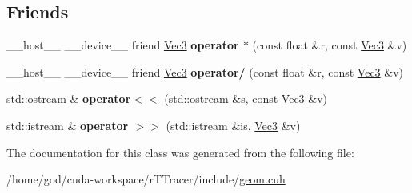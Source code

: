 \subsection*{Friends}
\begin{DoxyCompactItemize}
\item 
\+\_\+\+\_\+host\+\_\+\+\_\+ \+\_\+\+\_\+device\+\_\+\+\_\+ friend \hyperlink{class_vec3}{Vec3} {\bfseries operator $\ast$} (const float \&r, const \hyperlink{class_vec3}{Vec3} \&v)\hypertarget{class_vec3_a141803b5f0a53fcc6a6ffa5aea971591}{}\label{class_vec3_a141803b5f0a53fcc6a6ffa5aea971591}

\item 
\+\_\+\+\_\+host\+\_\+\+\_\+ \+\_\+\+\_\+device\+\_\+\+\_\+ friend \hyperlink{class_vec3}{Vec3} {\bfseries operator/} (const float \&r, const \hyperlink{class_vec3}{Vec3} \&v)\hypertarget{class_vec3_ad75f5e4b9aa9dec456c3bf19cd26ccb5}{}\label{class_vec3_ad75f5e4b9aa9dec456c3bf19cd26ccb5}

\item 
std\+::ostream \& {\bfseries operator$<$$<$} (std\+::ostream \&s, const \hyperlink{class_vec3}{Vec3} \&v)\hypertarget{class_vec3_a10e8b8671ee223eb6aea5a327901a5f0}{}\label{class_vec3_a10e8b8671ee223eb6aea5a327901a5f0}

\item 
std\+::istream \& {\bfseries operator $>$$>$} (std\+::istream \&is, \hyperlink{class_vec3}{Vec3} \&v)\hypertarget{class_vec3_ab9aefc3e1ca65751c7630a0154ede997}{}\label{class_vec3_ab9aefc3e1ca65751c7630a0154ede997}

\end{DoxyCompactItemize}


The documentation for this class was generated from the following file\+:\begin{DoxyCompactItemize}
\item 
/home/god/cuda-\/workspace/r\+T\+Tracer/include/\hyperlink{geom_8cuh}{geom.\+cuh}\end{DoxyCompactItemize}
